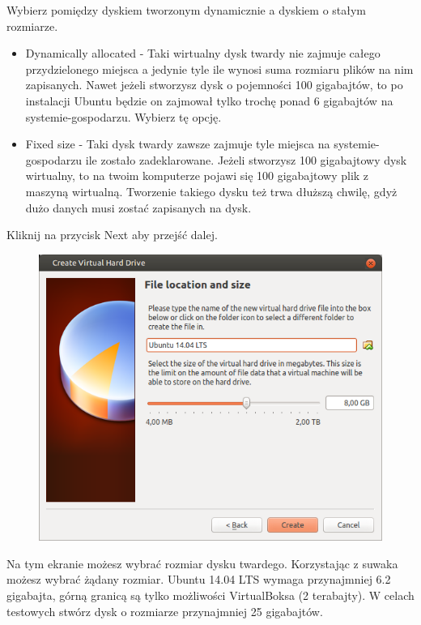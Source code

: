 Wybierz pomiędzy dyskiem tworzonym dynamicznie a dyskiem o stałym rozmiarze.
\begin{itemize}
\item \textcolor{ubuntu_orange}{Dynamically allocated} - Taki wirtualny dysk twardy nie zajmuje całego przydzielonego miejsca a jedynie tyle ile wynosi suma rozmiaru plików na nim zapisanych. Nawet jeżeli stworzysz dysk o pojemności 100 gigabajtów, to po instalacji Ubuntu będzie on zajmował tylko trochę ponad 6 gigabajtów na systemie-gospodarzu. Wybierz tę opcję.
\item \textcolor{ubuntu_orange}{Fixed size} - Taki dysk twardy zawsze zajmuje tyle miejsca na systemie-gospodarzu ile zostało zadeklarowane. Jeżeli stworzysz 100 gigabajtowy dysk wirtualny, to na twoim komputerze pojawi się 100 gigabajtowy plik z maszyną wirtualną. Tworzenie takiego dysku też trwa dłuższą chwilę, gdyż dużo danych musi zostać zapisanych na dysk.
\end{itemize}
\begin{flushright}
Kliknij na przycisk \textcolor{ubuntu_orange}{Next} aby przejść dalej.
\end{flushright}
\clearpage
\begin{figure}
                \includegraphics[width=\linewidth]{images/virtualbox_wizard6.png}
\end{figure}

Na tym ekranie możesz wybrać rozmiar dysku twardego. Korzystając z suwaka możesz wybrać żądany rozmiar. Ubuntu 14.04 LTS wymaga przynajmniej 6.2 gigabajta, górną granicą są tylko możliwości VirtualBoksa (2 terabajty). W celach testowych stwórz dysk o rozmiarze przynajmniej 25 gigabajtów.

